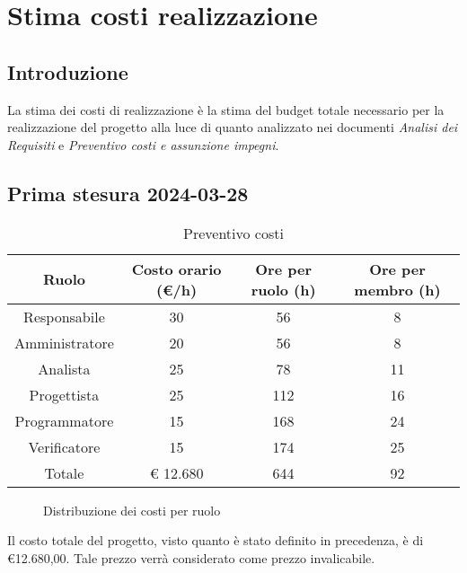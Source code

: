 
\section{Stima costi realizzazione}
\subsection{Introduzione}
La stima dei costi di realizzazione è la stima del budget totale necessario per la realizzazione del progetto alla luce di quanto analizzato nei documenti \textit{Analisi dei Requisiti} e \textit{Preventivo costi e assunzione impegni}.
\subsection{Prima stesura 2024-03-28}
\begin{table}[!h]
	\centering
		\begin{tabular}{ | c | c | c | c | }
			\hline
			\textbf{Ruolo}   & \textbf{Costo orario (€/h)} & \textbf{Ore per ruolo (h)} & \textbf{Ore per membro (h)} \\
			\hline
			Responsabile   & 30           & 56            & 8              \\
			Amministratore & 20           & 56            & 8              \\
			Analista       & 25           & 78            & 11             \\
			Progettista    & 25           & 112           & 16             \\
			Programmatore  & 15           & 168           & 24             \\
			Verificatore   & 15           & 174           & 25             \\
			\hline
			Totale         & € 12.680     & 644           & 92             \\
			\hline
		\end{tabular}
        \caption{Preventivo costi}
    \label{tab:12}
\end{table}
\begin{figure}[!h]
    \centering
    \caption{Distribuzione dei costi per ruolo}
    \label{fig:1}
\end{figure}
\begin{flushleft}
Il costo totale del progetto, visto quanto è stato definito in precedenza, è di €12.680,00. Tale prezzo verrà considerato come prezzo invalicabile.
\end{flushleft}
